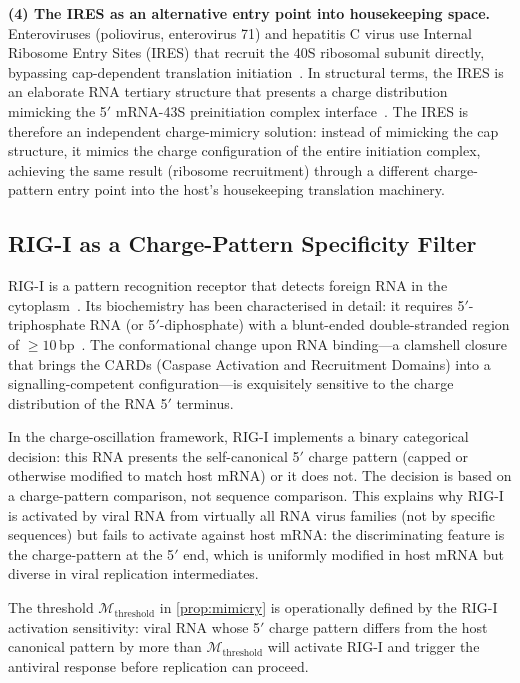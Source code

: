 \documentclass[11pt,twocolumn,a4paper]{article}
\theoremstyle{definition}
\theoremstyle{remark}
\begin{document}
\textbf{(4) The IRES as an alternative entry point into housekeeping space.}
Enteroviruses (poliovirus, enterovirus 71) and hepatitis C virus use Internal Ribosome Entry Sites (IRES) that recruit the 40S ribosomal subunit directly, bypassing cap-dependent translation initiation~\cite{Pelletier1988,Tsukiyama1992}. In structural terms, the IRES is an elaborate RNA tertiary structure that presents a charge distribution mimicking the 5$'$ mRNA-43S preinitiation complex interface~\cite{Yamamoto2020,Niepmann2009}. The IRES is therefore an independent charge-mimicry solution: instead of mimicking the cap structure, it mimics the charge configuration of the entire initiation complex, achieving the same result (ribosome recruitment) through a different charge-pattern entry point into the host's housekeeping translation machinery.

\subsection{RIG-I as a Charge-Pattern Specificity Filter}

RIG-I is a pattern recognition receptor that detects foreign RNA in the cytoplasm~\cite{Yoneyama2004}. Its biochemistry has been characterised in detail: it requires 5$'$-triphosphate RNA (or 5$'$-diphosphate) with a blunt-ended double-stranded region of $\geq 10$\,bp~\cite{Goubau2014,Devarkar2016}. The conformational change upon RNA binding---a clamshell closure that brings the CARDs (Caspase Activation and Recruitment Domains) into a signalling-competent configuration---is exquisitely sensitive to the charge distribution of the RNA 5$'$ terminus.

In the charge-oscillation framework, RIG-I implements a binary categorical decision: this RNA presents the self-canonical 5$'$ charge pattern (capped or otherwise modified to match host mRNA) or it does not. The decision is based on a charge-pattern comparison, not sequence comparison. This explains why RIG-I is activated by viral RNA from virtually all RNA virus families (not by specific sequences) but fails to activate against host mRNA: the discriminating feature is the charge-pattern at the 5$'$ end, which is uniformly modified in host mRNA but diverse in viral replication intermediates.

The threshold $\mathcal{M}_{\mathrm{threshold}}$ in \cref{prop:mimicry} is operationally defined by the RIG-I activation sensitivity: viral RNA whose 5$'$ charge pattern differs from the host canonical pattern by more than $\mathcal{M}_{\mathrm{threshold}}$ will activate RIG-I and trigger the antiviral response before replication can proceed.
\end{document}

